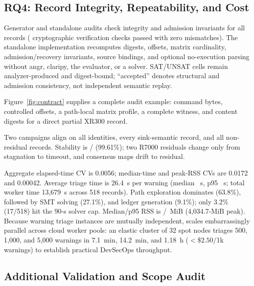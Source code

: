 \subsection{RQ4: Record Integrity, Repeatability, and Cost}

Generator and standalone audits check integrity and admission invariants for
all \TSDSRecords{} records (\TSDSReviewVerificationChecks{} cryptographic verification checks passed with zero mismatches). The standalone implementation recomputes digests,
offsets, matrix cardinality, admission/recovery invariants, source bindings,
and optional no-execution parsing without angr, claripy, the evaluator, or a
solver. SAT/UNSAT cells remain analyzer-produced and digest-bound; ``accepted''
denotes structural and admission consistency, not independent semantic replay.

Figure~\ref{fig:contract} supplies a complete audit example: command bytes,
controlled offsets, a path-local matrix profile, a complete witness, and
content digests for a direct partial XR300 record.



Two campaigns align on all \TSDSRecords{} identities, every
\TSDSSinkSemanticCore{} sink-semantic record, and all \TSDSNonResidual{}
non-residual records. Stability is \TSDSStableRecords{}/\TSDSRecords{}
(99.61\%); two R7000 residuals change only from stagnation to timeout, and
consensus maps drift to residual.

Aggregate elapsed-time CV is 0.0056; median-time and peak-RSS CVs are 0.0172 and 0.00042. Average triage time is 26.4~s per warning (median \TSDSMedianSeconds{}~s, p95 \TSDSPNinetyFiveSeconds{}~s; total worker time 13,679~s across 518 records). Path exploration dominates (63.8\%), followed by SMT solving (27.1\%), and ledger generation (9.1\%); only 3.2\% (17/518) hit the 90-s solver cap. Median/p95 RSS is \TSDSMedianRSS{}/\TSDSPNinetyFiveRSS{}~MiB (4,034.7-MiB peak). Because warning triage instances are mutually independent, \tool scales embarrassingly parallel across cloud worker pools: an elastic cluster of 32 spot nodes triages 500, 1{,}000, and 5{,}000 warnings in 7.1~min, 14.2~min, and 1.18~h ($<\!\$2.50$/1k warnings) to establish practical DevSecOps throughput.

\subsection{Additional Validation and Scope Audit}
\label{sec:additional-validation}

